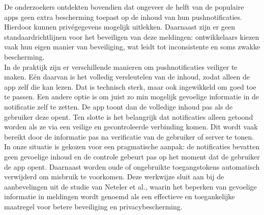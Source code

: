 De onderzoekers ontdekten bovendien dat ongeveer de helft van de populaire apps geen extra bescherming toepast op de inhoud van hun pushnotificaties. Hierdoor kunnen privégegevens mogelijk uitlekken\autocite{Neteler2024}. Daarnaast zijn er geen standaardrichtlijnen voor het beveiligen van deze meldingen: ontwikkelaars kiezen vaak hun eigen manier van beveiliging, wat leidt tot inconsistente en soms zwakke bescherming\autocite{Neteler2024}.\\

In de praktijk zijn er verschillende manieren om pushnotificaties veiliger te maken. Eén daarvan is het volledig versleutelen van de inhoud, zodat alleen de app zelf die kan lezen. Dat is technisch sterk, maar ook ingewikkeld om goed toe te passen. Een andere optie is om juist zo min mogelijk gevoelige informatie in de notificatie zelf te zetten. De app toont dan de volledige inhoud pas als de gebruiker deze opent. Ten slotte is het belangrijk dat notificaties alleen getoond worden als ze via een veilige en gecontroleerde verbinding komen. Dit wordt vaak bereikt door de informatie pas na verificatie van de gebruiker of server te tonen.\\

In onze situatie is gekozen voor een pragmatische aanpak: de notificaties bevatten geen gevoelige inhoud en de controle gebeurt pas op het moment dat de gebruiker de app opent. Daarnaast worden oude of ongebruikte toegangstokens automatisch verwijderd om misbruik te voorkomen. Deze werkwijze sluit aan bij de aanbevelingen uit de studie van Neteler et al., waarin het beperken van gevoelige informatie in meldingen wordt genoemd als een effectieve en toegankelijke maatregel voor betere beveiliging en privacybescherming\autocite{Neteler2024}.\\



